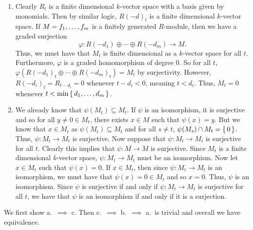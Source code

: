 \documentclass[letterpaper, 11pt, oneside]{book}
\begin{document}
\begin{sol}\label{ex:UAG_6.3.3}
  \begin{enumerate}
    \item Clearly $R_{t}$ is a finite dimensional $k$-vector space with a basis given by monomials.
          Then by similar logic, $R(-d)_{t}$ is a finite dimensional $k$-vector space.
          If $M = \gen{f_{1}, \ldots, f_{m}}$ is a finitely generated $R$-module, then we have a graded surjection
          \[
          \varphi\colon R(-d_{1}) \oplus \cdots \oplus R(-d_{m}) \to M.
          \]
          Thus, we must have that $M_{t}$ is finite dimensional as a $k$-vector space for all $t$.
          Furthermore, $\varphi$ is a graded homomorphism of degree $0$.
          So for all $t$, $\varphi(R(-d_{1})_{t} \oplus \cdots \oplus R(-d_{m})_{t}) = M_{t}$ by surjectivity.
          However, $R(-d_{i})_{t} = R_{t -d_{i}} = 0$ whenever $t - d_{i} < 0$, meaning $t < d_{i}$.
          Thus, $M_{t} = 0$ whenever $t < \min\set{d_{1}, \ldots, d_{m}}$.
    \item We already know that $\psi(M_{t}) \subseteq M_{t}$.
          If $\psi$ is an isomorphism, it is surjective and so for all $y \neq 0 \in M_{t}$, there exists $x \in M$ such that $\psi(x) = y$.
          But we know that $x \in M_{t}$ as $\psi(M_{t}) \subseteq M_{t}$ and for all $s \neq t$, $\psi(M_{s}) \cap M_{t} = \set{0}$.
          Thus, $\psi\colon M_{t} \to M_{t}$ is surjective.
          Now suppose that $\psi\colon M_{t} \to M_{t}$ is surjective for all $t$.
          Clearly this implies that $\psi\colon M \to M$ is surjective.
          Since $M_{t}$ is a finite dimensional $k$-vector space, $\psi\colon M_{t} \to M_{t}$ must be an isomorphism.
          Now let $x \in M_{t}$ such that $\psi(x) = 0$.
          If $x \in M_{t}$, then since $\psi\colon M_{t} \to M_{t}$ is an isomorphism, we must have that $\psi(x) = 0 \in M_{t}$ and so $x = 0$.
          Thus, $\psi$ is an isomorphism.
          Since $\psi$ is surjective if and only if $\psi\colon M_{t} \to M_{t}$ is surjective for all $t$, we have that $\psi$ is an isomorphism if and only if it is a surjection.
  \end{enumerate}
\end{sol}

\begin{sol}\label{ex:UAG_6.3.8}
  We first show a.\ $\implies$ c.
  Then c.\ $\implies$ b.\ $\implies$ a.\ is trivial and overall we have equivalence.
\end{sol}
\end{document}
